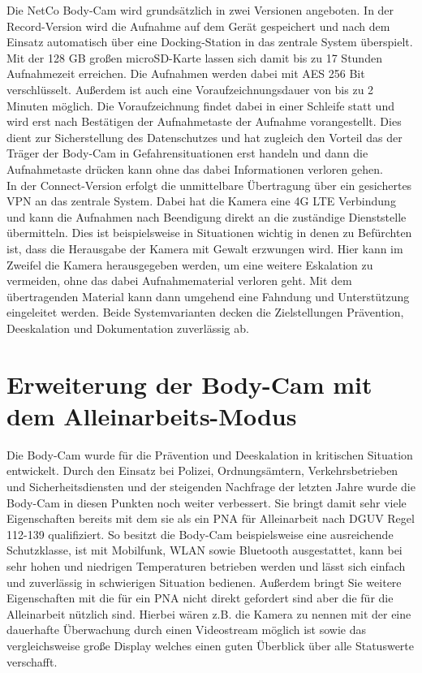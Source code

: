 \documentclass[thesis.tex]{subfiles}
\begin{document}
Die NetCo Body-Cam wird grundsätzlich in zwei Versionen angeboten.
In der Record-Version wird die Aufnahme auf dem Gerät gespeichert und nach dem Einsatz automatisch über eine Docking-Station in das zentrale System überspielt.
Mit der 128 GB großen microSD-Karte lassen sich damit bis zu 17 Stunden Aufnahmezeit erreichen.
Die Aufnahmen werden dabei mit AES 256 Bit verschlüsselt.
Außerdem ist auch eine Voraufzeichnungsdauer von bis zu 2 Minuten möglich.
Die Voraufzeichnung findet dabei in einer Schleife statt und wird erst nach Bestätigen der Aufnahmetaste der Aufnahme vorangestellt.
Dies dient zur Sicherstellung des Datenschutzes und hat zugleich den Vorteil das der Träger der Body-Cam in Gefahrensituationen erst handeln und dann die Aufnahmetaste drücken kann ohne das dabei Informationen verloren gehen.
\\

In der Connect-Version erfolgt die unmittelbare Übertragung über ein gesichertes VPN an das zentrale System.
Dabei hat die Kamera eine 4G LTE Verbindung und kann die Aufnahmen nach Beendigung direkt an die zuständige Dienststelle übermitteln.
Dies ist beispielsweise in Situationen wichtig in denen zu Befürchten ist, dass die Herausgabe der Kamera mit Gewalt erzwungen wird.
Hier kann im Zweifel die Kamera herausgegeben werden, um eine weitere Eskalation zu vermeiden, ohne das dabei Aufnahmematerial verloren geht.
Mit dem übertragenden Material kann dann umgehend eine Fahndung und Unterstützung eingeleitet werden.
Beide Systemvarianten decken die Zielstellungen Prävention, Deeskalation und Dokumentation zuverlässig ab.

\section{Erweiterung der Body-Cam mit dem Alleinarbeits-Modus}

Die Body-Cam wurde für die Prävention und Deeskalation in kritischen Situation entwickelt.
Durch den Einsatz bei Polizei, Ordnungsämtern, Verkehrsbetrieben und Sicherheitsdiensten und der steigenden Nachfrage der letzten Jahre wurde die Body-Cam in diesen Punkten noch weiter verbessert.
Sie bringt damit sehr viele Eigenschaften bereits mit dem sie als ein PNA für Alleinarbeit nach DGUV Regel 112-139 \cite[]{Regel_112-139} qualifiziert.
So besitzt die Body-Cam beispielsweise eine ausreichende Schutzklasse, ist mit Mobilfunk, WLAN sowie Bluetooth ausgestattet, kann bei sehr hohen und niedrigen Temperaturen betrieben werden und lässt sich einfach und zuverlässig in schwierigen Situation bedienen.
Außerdem bringt Sie weitere Eigenschaften mit die für ein PNA nicht direkt gefordert sind aber die für die Alleinarbeit nützlich sind.
Hierbei wären z.B. die Kamera zu nennen mit der eine dauerhafte Überwachung durch einen Videostream möglich ist sowie das vergleichsweise große Display welches einen guten Überblick über alle Statuswerte verschafft.
\\
\end{document}
